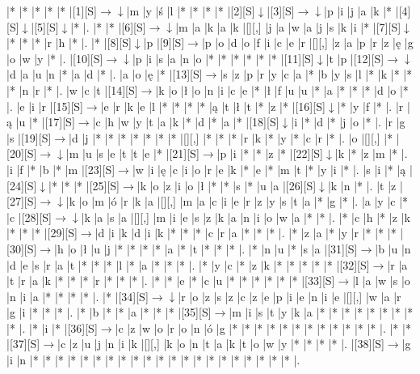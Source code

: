 \documentclass[11pt]{article}
\newcommand\drarr{$\rightarrow \!\!\!\!\! \downarrow$}
\newcommand\rarr{$\rightarrow$}
\newcommand\darr{$\downarrow$}
\begin{document}
\noindent\begin{Puzzle}{24}{23}|*	|*	|*	|*	|*	|[1][S]\drarr	|m	|y	|ś	|l	|*	|*	|*	|*	|[2][S]\darr	|[3][S]\drarr	|p	|i	|j	|a	|k	|*	|[4][S]\darr	|[5][S]\darr	|*	|.
|*	|*	|[6][S]\drarr	|m	|a	|k	|a	|k	|[][,]{ }	|j	|a	|w	|a	|j	|s	|k	|i	|*	|[7][S]\darr	|*	|*	|*	|r	|h	|*	|.
|*	|[8][S]\darr	|p	|[9][S]\rarr	|p	|o	|d	|o	|f	|i	|c	|e	|r	|[][,]{ }	|z	|a	|p	|r	|z	|ę	|g	|o	|w	|y	|*	|.
|[10][S]\drarr	|p	|i	|s	|a	|n	|o	|*	|*	|*	|*	|*	|*	|[11][S]\darr	|t	|p	|[12][S]\drarr	|d	|a	|u	|n	|*	|a	|d	|*	|.
|a	|o	|ę	|*	|[13][S]\rarr	|s	|z	|p	|r	|y	|c	|a	|*	|b	|y	|s	|l	|*	|k	|*	|*	|*	|n	|r	|*	|.
|w	|c	|t	|[14][S]\rarr	|k	|o	|ł	|o	|n	|i	|c	|e	|*	|ł	|f	|u	|u	|*	|a	|*	|*	|*	|d	|o	|*	|.
|e	|i	|r	|[15][S]\rarr	|e	|r	|k	|e	|l	|*	|*	|*	|*	|ą	|t	|ł	|t	|*	|z	|*	|[16][S]\darr	|*	|y	|f	|*	|.
|r	|ą	|u	|*	|[17][S]\rarr	|c	|h	|w	|y	|t	|a	|k	|*	|d	|*	|a	|*	|[18][S]\darr	|i	|*	|d	|*	|j	|o	|*	|.
|r	|g	|s	|[19][S]\rarr	|d	|j	|*	|*	|*	|*	|*	|*	|*	|[][,]{ }	|*	|*	|*	|r	|k	|*	|y	|*	|c	|r	|*	|.
|o	|[][,]{ }	|*	|[20][S]\drarr	|m	|u	|s	|e	|t	|t	|e	|*	|[21][S]\rarr	|p	|i	|*	|*	|z	|*	|[22][S]\darr	|k	|*	|z	|m	|*	|.
|i	|f	|*	|b	|*	|m	|[23][S]\rarr	|w	|i	|ę	|c	|i	|o	|r	|e	|k	|*	|e	|*	|m	|t	|*	|y	|i	|*	|.
|s	|i	|*	|ą	|[24][S]\darr	|*	|*	|*	|[25][S]\rarr	|k	|o	|z	|i	|o	|ł	|*	|*	|s	|*	|u	|a	|[26][S]\darr	|k	|n	|*	|.
|t	|z	|[27][S]\drarr	|k	|o	|m	|ó	|r	|k	|a	|[][,]{ }	|m	|a	|c	|i	|e	|r	|z	|y	|s	|t	|a	|*	|g	|*	|.
|a	|y	|c	|*	|c	|[28][S]\drarr	|k	|a	|s	|a	|[][,]{ }	|m	|i	|e	|s	|z	|k	|a	|n	|i	|o	|w	|a	|*	|*	|.
|*	|c	|h	|*	|z	|k	|*	|*	|*	|[29][S]\rarr	|d	|i	|k	|d	|i	|k	|*	|*	|*	|c	|r	|a	|*	|*	|*	|.
|*	|z	|a	|*	|y	|r	|*	|*	|*	|[30][S]\rarr	|h	|o	|ł	|u	|j	|*	|*	|*	|*	|a	|*	|t	|*	|*	|*	|.
|*	|n	|u	|*	|s	|a	|[31][S]\rarr	|b	|u	|n	|d	|e	|s	|r	|a	|t	|*	|*	|*	|l	|*	|a	|*	|*	|*	|.
|*	|y	|c	|*	|z	|k	|*	|*	|*	|*	|*	|[32][S]\rarr	|r	|a	|t	|r	|a	|k	|*	|*	|*	|r	|*	|*	|*	|.
|*	|*	|e	|*	|c	|u	|*	|*	|*	|*	|*	|*	|[33][S]\rarr	|l	|a	|w	|s	|o	|n	|i	|a	|*	|*	|*	|*	|.
|*	|[34][S]\drarr	|r	|o	|z	|s	|z	|c	|z	|e	|p	|i	|e	|n	|i	|e	|[][,]{ }	|w	|a	|r	|g	|i	|*	|*	|*	|.
|*	|b	|*	|*	|a	|*	|*	|*	|[35][S]\rarr	|m	|i	|s	|t	|y	|k	|a	|*	|*	|*	|*	|*	|*	|*	|*	|*	|.
|*	|i	|*	|[36][S]\rarr	|c	|z	|w	|o	|r	|o	|n	|ó	|g	|*	|*	|*	|*	|*	|*	|*	|*	|*	|*	|*	|*	|.
|*	|*	|[37][S]\rarr	|c	|z	|u	|j	|n	|i	|k	|[][,]{ }	|k	|o	|n	|t	|a	|k	|t	|o	|w	|y	|*	|*	|*	|*	|.
|[38][S]\rarr	|g	|i	|n	|*	|*	|*	|*	|*	|*	|*	|*	|*	|*	|*	|*	|*	|*	|*	|*	|*	|*	|*	|*	|*	|.\end{Puzzle}

\newpage
\end{document}

